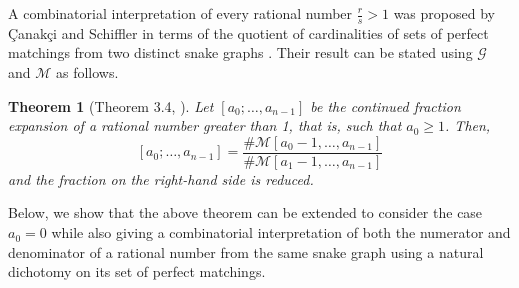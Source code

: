 \documentclass[a4paper,12pt]{amsart}
\newtheorem{theorem}[definition]{Theorem}
\newcommand{\Gcal}{{\mathcal{G}}}
\newcommand{\Mcal}{{\mathcal{M}}}
\newcommand{\0}{\mathtt{0}}
\newcommand{\1}{\mathtt{1}}
\newcommand{\2}{\mathtt{2}}
\newcommand{\3}{\mathtt{3}}
\begin{document}
%

A combinatorial interpretation of every rational number $\frac{r}{s}>1$ was
proposed by {\c{C}}anak\c{c}i and Schiffler
in terms of the quotient of cardinalities of sets of perfect matchings from
two distinct snake graphs \cite{MR3778183}.
Their result can be stated using $\Gcal$ and $\Mcal$ as follows.

\begin{theorem}[Theorem 3.4, \cite{MR3778183}]\label{thm:schiffler}
Let $[a_0;\dots,a_{n-1}]$ be the continued fraction expansion
of a rational number greater than 1, that is, such that $a_0\geq 1$.
Then,
\[
[a_0;\dots,a_{n-1}]
=
\frac{\#\Mcal [a_0-1,\dots,a_{n-1}]}
     {\#\Mcal [a_1-1,\dots,a_{n-1}]}
\]
and the fraction on the right-hand side is reduced.
\end{theorem}

Below, we show that the above theorem can be extended to
consider the case $a_0=0$ while also giving a combinatorial
interpretation of both the numerator and denominator of a rational
number from the same snake graph using a natural dichotomy on its
set of perfect matchings.
\end{document}
